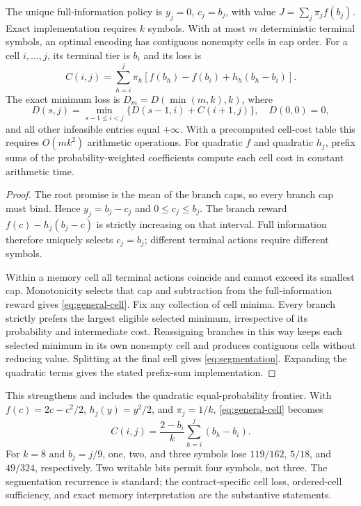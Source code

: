 \begin{theorem}\label{thm:frontier}
The unique full-information policy is $y_j=0$, $c_j=b_j$, with value $J=\sum_j\pi_j f(b_j)$. Exact implementation requires $k$ symbols. With at most $m$ deterministic terminal symbols, an optimal encoding has contiguous nonempty cells in cap order. For a cell $i,\ldots,j$, its terminal tier is $b_i$ and its loss is
\begin{equation}\label{eq:general-cell}
 C(i,j)=\sum_{h=i}^j\pi_h\left[f(b_h)-f(b_i)+h_h(b_h-b_i)\right].
\end{equation}
The exact minimum loss is $D_m=D(\min(m,k),k)$, where
\begin{equation}\label{eq:segmentation}
 D(s,j)=\min_{s-1\leq i<j}\{D(s-1,i)+C(i+1,j)\},\quad D(0,0)=0,
\end{equation}
and all other infeasible entries equal $+\infty$. With a precomputed cell-cost table this requires $O(mk^2)$ arithmetic operations. For quadratic $f$ and quadratic $h_j$, prefix sums of the probability-weighted coefficients compute each cell cost in constant arithmetic time.
\end{theorem}
\begin{proof}
The root promise is the mean of the branch caps, so every branch cap must bind. Hence $y_j=b_j-c_j$ and $0\leq c_j\leq b_j$. The branch reward $f(c)-h_j(b_j-c)$ is strictly increasing on that interval. Full information therefore uniquely selects $c_j=b_j$; different terminal actions require different symbols.

Within a memory cell all terminal actions coincide and cannot exceed its smallest cap. Monotonicity selects that cap and subtraction from the full-information reward gives \eqref{eq:general-cell}. Fix any collection of cell minima. Every branch strictly prefers the largest eligible selected minimum, irrespective of its probability and intermediate cost. Reassigning branches in this way keeps each selected minimum in its own nonempty cell and produces contiguous cells without reducing value. Splitting at the final cell gives \eqref{eq:segmentation}. Expanding the quadratic terms gives the stated prefix-sum implementation.
\end{proof}

This strengthens and includes the quadratic equal-probability frontier. With $f(c)=2c-c^2/2$, $h_j(y)=y^2/2$, and $\pi_j=1/k$, \eqref{eq:general-cell} becomes
\begin{equation}\label{eq:old-cell}
 C(i,j)=\frac{2-b_i}{k}\sum_{h=i}^j(b_h-b_i).
\end{equation}
For $k=8$ and $b_j=j/9$, one, two, and three symbols lose $119/162$, $5/18$, and $49/324$, respectively. Two writable bits permit four symbols, not three. The segmentation recurrence is standard; the contract-specific cell loss, ordered-cell sufficiency, and exact memory interpretation are the substantive statements.

